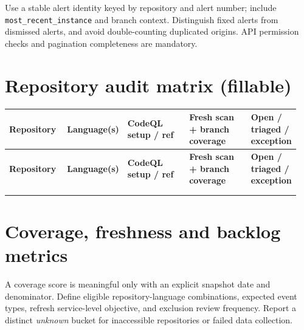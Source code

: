 \documentclass[11pt,letterpaper,oneside]{book}
\begin{document}
Use a stable alert identity keyed by repository and alert number; include \texttt{most\_recent\_instance} and branch context. Distinguish fixed alerts from dismissed alerts, and avoid double-counting duplicated origins. API permission checks and pagination completeness are mandatory.

\section{Repository audit matrix (fillable)}

\small
\setlength{\tabcolsep}{2pt}
\renewcommand{\arraystretch}{1.18}
\begin{longtable}{>{\raggedright\arraybackslash}p{0.2\linewidth}>{\raggedright\arraybackslash}p{0.16\linewidth}>{\raggedright\arraybackslash}p{0.22\linewidth}>{\raggedright\arraybackslash}p{0.22\linewidth}>{\raggedright\arraybackslash}p{0.15\linewidth}}
\toprule
\textbf{Repository} & \textbf{Language(s)} & \textbf{CodeQL setup / ref} & \textbf{Fresh scan + branch coverage} & \textbf{Open / triaged / exception}\\
\midrule
\endfirsthead
\toprule
\textbf{Repository} & \textbf{Language(s)} & \textbf{CodeQL setup / ref} & \textbf{Fresh scan + branch coverage} & \textbf{Open / triaged / exception}\\
\midrule
\endhead
\rule{0pt}{15pt}\underline{\hspace{2cm}} & \underline{\hspace{1.45cm}} & \underline{\hspace{2cm}} & \underline{\hspace{2cm}} & \underline{\hspace{1.65cm}}\\
\rule{0pt}{15pt}\underline{\hspace{2cm}} & \underline{\hspace{1.45cm}} & \underline{\hspace{2cm}} & \underline{\hspace{2cm}} & \underline{\hspace{1.65cm}}\\
\bottomrule
\end{longtable}
\normalsize

\section{Coverage, freshness and backlog metrics}

A coverage score is meaningful only with an explicit snapshot date and denominator. Define eligible repository-language combinations, expected event types, refresh service-level objective, and exclusion review frequency. Report a distinct \emph{unknown} bucket for inaccessible repositories or failed data collection.
\end{document}
